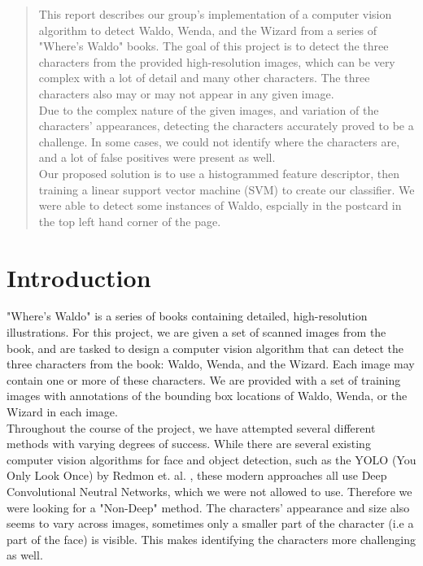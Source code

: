 \documentclass[11pt]{article}
\begin{document}
	

\begin{abstract}
This report describes our group's implementation of a computer vision algorithm to detect Waldo, Wenda, and the Wizard from a series of "Where's Waldo" books. The goal of this project is to detect the three characters from the provided high-resolution images, which can be very complex with a lot of detail and many other characters. The three characters also may or may not appear in any given image.\\

Due to the complex nature of the given images, and variation of the characters' appearances, detecting the characters accurately proved to be a challenge. In some cases, we could not identify where the characters are, and a lot of false positives were present as well.\\

Our proposed solution is to use a histogrammed feature descriptor, then training a linear support vector machine (SVM) to create our classifier. We were able to detect some instances of Waldo, espcially in the postcard in the top left hand corner of the page.


\end{abstract}
\section{Introduction}


"Where's Waldo" is a series of books containing detailed, high-resolution illustrations. For this project, we are given a set of scanned images from the book, and are tasked to design a computer vision algorithm that can detect the three characters from the book: Waldo, Wenda, and the Wizard. Each image may contain one or more of these characters. We are provided with a set of training images with annotations of the bounding box locations of Waldo, Wenda, or the Wizard in each image.\\

Throughout the course of the project, we have attempted several different methods with varying degrees of success. 
While there are several existing computer vision algorithms for face and object detection, 
such as the YOLO (You Only Look Once) by Redmon et. al. \cite{redmon2016yolo}, these modern approaches
all use Deep Convolutional Neutral Networks, which we were not allowed to use. Therefore we were looking for a "Non-Deep" method.
The characters' appearance and size also seems to vary across images, sometimes only a smaller part of the character (i.e a part of the face) is visible. This makes identifying the characters more challenging as well.\\
\end{document}
